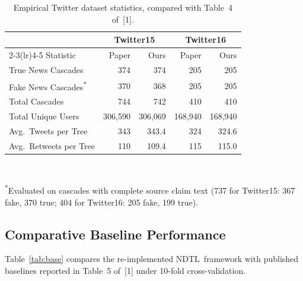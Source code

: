 \documentclass[10pt,twocolumn,a4paper]{article}
\newcommand{\NDTL}{\textsc{NDTL}}
\begin{document}
\begin{table}[t]
\centering
\caption{Empirical Twitter dataset statistics, compared with Table~4 of~[1].}
\label{tab:data}
\scriptsize
\setlength{\tabcolsep}{2.5pt}
\begin{tabular}{lrrrr}
\toprule
 & \multicolumn{2}{c}{Twitter15} & \multicolumn{2}{c}{Twitter16}\\
\cmidrule(lr){2-3}\cmidrule(lr){4-5}
Statistic & Paper & Ours & Paper & Ours\\
\midrule
True News Cascades & 374 & 374 & 205 & 205\\
Fake News Cascades\textsuperscript{*} & 370 & 368 & 205 & 205\\
Total Cascades & 744 & 742 & 410 & 410\\
Total Unique Users & 306,590 & 306,069 & 168,940 & 168,940\\
Avg.\ Tweets per Tree & 343 & 343.4 & 324 & 324.6\\
Avg.\ Retweets per Tree & 110 & 109.4 & 115 & 115.0\\
\bottomrule
\end{tabular}\\[2pt]
\raggedright \textsuperscript{*}\tiny Evaluated on cascades with complete source claim text (737 for Twitter15: 367 fake, 370 true; 404 for Twitter16: 205 fake, 199 true).
\end{table}
 
\subsection{Comparative Baseline Performance}
Table~\ref{tab:base} compares the re-implemented \NDTL\ framework with published baselines reported in Table~5 of~[1] under 10-fold cross-validation.
 
\end{document}
